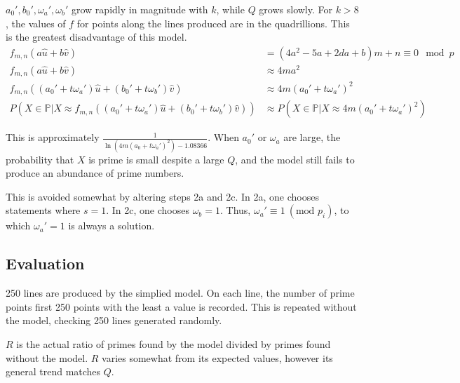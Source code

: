 \documentclass{article}
\begin{document}
\(a_0',b_0',\omega_a',\omega_b'\) grow rapidly in magnitude with \(k\), while \(Q\) grows slowly. For \(k > 8\), the values of \(f\) for points along the lines produced are in the quadrillions. This is the greatest disadvantage of this model.
\begin{align}
\nonumber f_{m,n}(a\hat{u}+b\hat{v}) &= (4a^2 - 5a + 2da + b)m + n \equiv 0 \mod p \\
\nonumber f_{m,n}(a\hat{u}+b\hat{v}) &\approx 4ma^2 \\
\nonumber f_{m,n}((a_0'+t\omega_a')\hat{u}+(b_0'+t\omega_b')\hat{v}) &\approx 4m(a_0'+t\omega_a')^2 \\
\nonumber P(X \in \mathbb{P}|X \approx f_{m,n}((a_0'+t\omega_a')\hat{u}+(b_0'+t\omega_b')\hat{v})) &\approx P(X \in \mathbb{P}|X \approx 4m(a_0'+t\omega_a')^2)
\end{align}
	
This is approximately \(\frac{1}{\ln(4m(a_0+t\omega_a')^2) - 1.08366}\). When \(a_0'\) or \(\omega_a\) are large, the probability that \(X\) is prime is small despite a large \(Q\), and the model still fails to produce an abundance of prime numbers.

This is avoided somewhat by altering steps 2a and 2c. In 2a, one chooses statements where \(s = 1\). In 2c, one chooses \(\omega_b = 1\). Thus, \(\omega_a' \equiv 1\ (\text{mod }p_i)\), to which \(\omega_a' = 1\) is always a solution.


\subsection{Evaluation}

250 lines are produced by the simplied model. On each line, the number of prime points first 250 points with the least a value is recorded. This is repeated without the model, checking 250 lines generated randomly.

\(R\) is the actual ratio of primes found by the model divided by primes found without the model. \(R\) varies somewhat from its expected values, however its general trend matches \(Q\).
\end{document}
